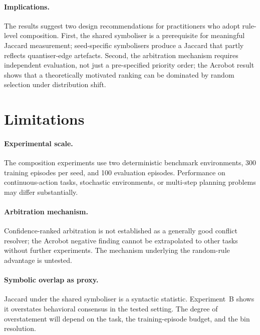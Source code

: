 \documentclass[12pt]{article}
\begin{document}
\paragraph{Implications.}
The results suggest two design recommendations for practitioners who
adopt rule-level composition.
First, the shared symboliser is a prerequisite for meaningful Jaccard
measurement; seed-specific symbolisers produce a Jaccard that partly
reflects quantiser-edge artefacts.
Second, the arbitration mechanism requires independent evaluation,
not just a pre-specified priority order; the Acrobot result shows that
a theoretically motivated ranking can be dominated by random selection
under distribution shift.

\section{Limitations}
\label{sec:limitations}

\paragraph{Experimental scale.}
The composition experiments use two deterministic benchmark environments,
300 training episodes per seed, and 100 evaluation episodes.
Performance on continuous-action tasks, stochastic environments, or
multi-step planning problems may differ substantially.

\paragraph{Arbitration mechanism.}
Confidence-ranked arbitration is not established as a generally good
conflict resolver; the Acrobot negative finding cannot be extrapolated
to other tasks without further experiments.
The mechanism underlying the random-rule advantage is untested.

\paragraph{Symbolic overlap as proxy.}
Jaccard under the shared symboliser is a syntactic statistic.
Experiment~B shows it overstates behavioral consensus in the tested
setting.
The degree of overstatement will depend on the task, the training-episode
budget, and the bin resolution.
\end{document}
